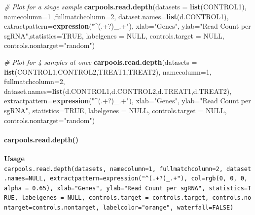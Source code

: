 \documentclass[]{article}
\newenvironment{Shaded}{\begin{snugshade}}{\end{snugshade}}
\newcommand{\KeywordTok}[1]{\textcolor[rgb]{0.13,0.29,0.53}{\textbf{{#1}}}}
\newcommand{\DataTypeTok}[1]{\textcolor[rgb]{0.13,0.29,0.53}{{#1}}}
\newcommand{\DecValTok}[1]{\textcolor[rgb]{0.00,0.00,0.81}{{#1}}}
\newcommand{\StringTok}[1]{\textcolor[rgb]{0.31,0.60,0.02}{{#1}}}
\newcommand{\CommentTok}[1]{\textcolor[rgb]{0.56,0.35,0.01}{\textit{{#1}}}}
\newcommand{\OtherTok}[1]{\textcolor[rgb]{0.56,0.35,0.01}{{#1}}}
\newcommand{\NormalTok}[1]{{#1}}
\let\oldparagraph\paragraph
\renewcommand{\paragraph}[1]{\oldparagraph{#1}\mbox{}}
\begin{document}
\begin{Shaded}
\begin{Highlighting}[]
\CommentTok{# Plot for a singe sample}
\KeywordTok{carpools.read.depth}\NormalTok{(}\DataTypeTok{datasets =} \KeywordTok{list}\NormalTok{(CONTROL1), }\DataTypeTok{namecolumn=}\DecValTok{1} \NormalTok{,}\DataTypeTok{fullmatchcolumn=}\DecValTok{2}\NormalTok{,}
  \DataTypeTok{dataset.names=}\KeywordTok{list}\NormalTok{(d.CONTROL1), }\DataTypeTok{extractpattern=}\KeywordTok{expression}\NormalTok{(}\StringTok{"^(.+?)_.+"}\NormalTok{),}
  \DataTypeTok{xlab=}\StringTok{"Genes"}\NormalTok{, }\DataTypeTok{ylab=}\StringTok{"Read Count per sgRNA"}\NormalTok{,}\DataTypeTok{statistics=}\OtherTok{TRUE}\NormalTok{, }\DataTypeTok{labelgenes =} \OtherTok{NULL}\NormalTok{,}
  \DataTypeTok{controls.target =} \OtherTok{NULL}\NormalTok{, }\DataTypeTok{controls.nontarget=}\StringTok{"random"}\NormalTok{)}

\CommentTok{# Plot for 4 samples at once}
\KeywordTok{carpools.read.depth}\NormalTok{(}\DataTypeTok{datasets =} \KeywordTok{list}\NormalTok{(CONTROL1,CONTROL2,TREAT1,TREAT2), }\DataTypeTok{namecolumn=}\DecValTok{1}\NormalTok{,}
  \DataTypeTok{fullmatchcolumn=}\DecValTok{2}\NormalTok{, }\DataTypeTok{dataset.names=}\KeywordTok{list}\NormalTok{(d.CONTROL1,d.CONTROL2,d.TREAT1,d.TREAT2),}
  \DataTypeTok{extractpattern=}\KeywordTok{expression}\NormalTok{(}\StringTok{"^(.+?)_.+"}\NormalTok{), }\DataTypeTok{xlab=}\StringTok{"Genes"}\NormalTok{, }\DataTypeTok{ylab=}\StringTok{"Read Count per sgRNA"}\NormalTok{, }
  \DataTypeTok{statistics=}\OtherTok{TRUE}\NormalTok{, }\DataTypeTok{labelgenes =} \OtherTok{NULL}\NormalTok{, }\DataTypeTok{controls.target =} \OtherTok{NULL}\NormalTok{, }\DataTypeTok{controls.nontarget=}\StringTok{"random"}\NormalTok{)}
\end{Highlighting}
\end{Shaded}

\paragraph{carpools.read.depth()}\label{carpools.read.depth}

\textbf{Usage}\\
\texttt{carpools.read.depth(datasets,\ namecolumn=1,\ fullmatchcolumn=2,\ dataset.names=NULL,\ extractpattern=expression("\^{}(.+?)\_.+"),\ col=rgb(0,\ 0,\ 0,\ alpha\ =\ 0.65),\ xlab="Genes",\ ylab="Read\ Count\ per\ sgRNA",\ statistics=TRUE,\ labelgenes\ =\ NULL,\ controls.target\ =\ controls.target,\ controls.nontarget=controls.nontarget,\ labelcolor="orange",\ waterfall=FALSE)}
\end{document}
